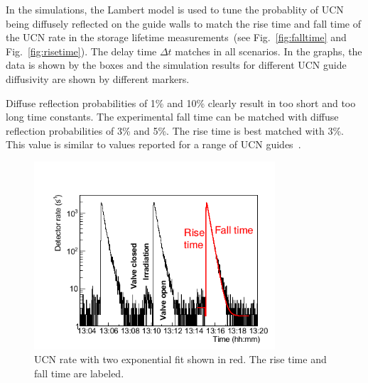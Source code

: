 In the simulations, the Lambert model is used to tune the probablity
of UCN being diffusely reflected on the guide walls to match the rise
time and fall time of the UCN rate in the storage lifetime
measurements~(see Fig.~\ref{fig:falltime} and
Fig.~\ref{fig:risetime}).  The delay time $\Delta t$ matches in all
scenarios.  In the graphs, the data is shown by the boxes and the
simulation results for different UCN guide diffusivity are shown by
different markers.

Diffuse reflection probabilities of 1\% and 10\% clearly result in too
short and too long time constants. The experimental fall time can be
matched with diffuse reflection probabilities of 3\% and 5\%. The rise
time is best matched with 3\%. This value is similar to values
reported for a range of UCN
guides~\cite{DAUM201471,Wlokka2017,Atchison2010}.


\begin{figure}[h!]
  \centering
  \includegraphics[width=0.8\textwidth]{risefalltime.png}
  \caption{UCN rate with two exponential fit shown in red. The rise
    time and fall time are labeled.}
  \label{fig:risefalltime}
\end{figure}


